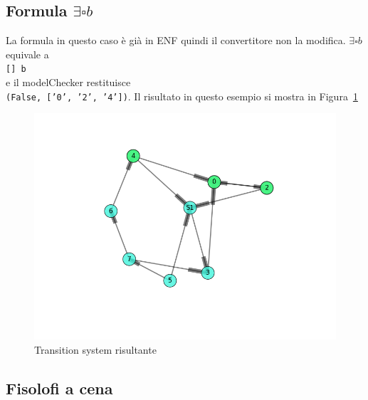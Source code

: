 \documentclass[a4paper, 10pt]{article}
\numberwithin{equation}{theor}
\begin{document}
\subsection{Formula $ \exists \square b$}
La formula in questo caso è già in \ac{ENF} quindi il convertitore non la modifica.
$ \exists \square b$ equivale a
\\
\texttt{[] b}
\\ e il modelChecker restituisce \\
\texttt{(False, ['0', '2', '4'])}.
Il risultato in questo esempio si mostra in Figura~\ref{tsResult2}
\begin{figure}
  \includegraphics[width=\linewidth]{img/tsResult2.png}
  \caption{Transition system risultante}
  \label{tsResult2}
\end{figure}

\subsection{Fisolofi a cena}
\end{document}
